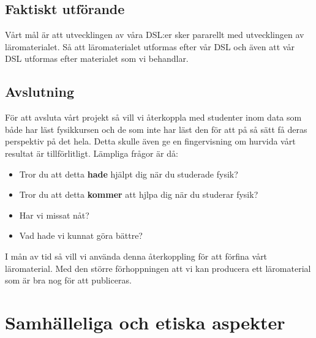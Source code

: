 \documentclass[12pt,a4paper]{scrartcl}
\begin{document}
\subsection{Faktiskt utförande}

Vårt mål är att utvecklingen av våra DSL:er sker pararellt med utvecklingen av läromaterialet. Så att läromaterialet utformas efter vår DSL och även att vår DSL utformas efter materialet som vi behandlar. 



\subsection{Avslutning}

För att avsluta vårt projekt så vill vi återkoppla med studenter inom data som både har läst fysikkursen och de som inte har läst den för att på så sätt få deras perspektiv på det hela. Detta skulle även ge en fingervisning om hurvida vårt resultat är tillförlitligt. Lämpliga frågor är då:

\begin{itemize}
    \item Tror du att detta \textbf{hade} hjälpt dig när du studerade fysik?
    \item Tror du att detta \textbf{kommer} att hjlpa dig när du studerar fysik?
    \item Har vi missat nåt?
    \item Vad hade vi kunnat göra bättre?
\end{itemize}

I mån av tid så vill vi använda denna återkoppling för att förfina vårt läromaterial. Med den större förhoppningen att vi kan producera ett läromaterial som är bra nog för att publiceras.

\section{Samhälleliga och etiska aspekter}
\end{document}
